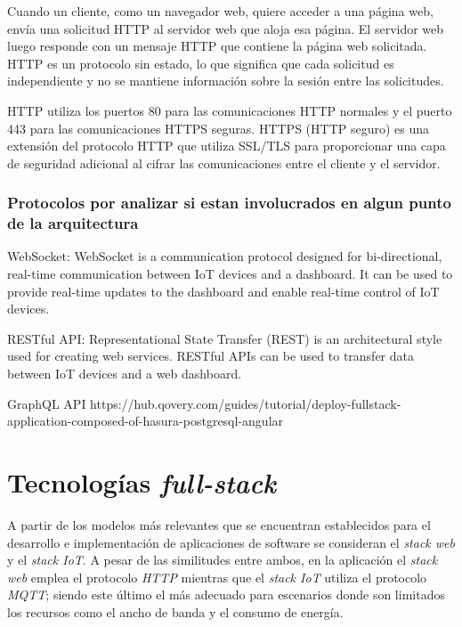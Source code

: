 Cuando un cliente, como un navegador web, quiere acceder a una página web, envía una solicitud HTTP al servidor web que aloja esa página. El servidor web luego responde con un mensaje HTTP que contiene la página web solicitada. HTTP es un protocolo sin estado, lo que significa que cada solicitud es independiente y no se mantiene información sobre la sesión entre las solicitudes.

HTTP utiliza los puertos 80 para las comunicaciones HTTP normales y el puerto 443 para las comunicaciones HTTPS seguras. HTTPS (HTTP seguro) es una extensión del protocolo HTTP que utiliza SSL/TLS para proporcionar una capa de seguridad adicional al cifrar las comunicaciones entre el cliente y el servidor.




\subsubsection{Protocolos por analizar si estan involucrados en algun punto de la arquitectura}


WebSocket: WebSocket is a communication protocol designed for bi-directional, real-time communication between IoT devices and a dashboard. It can be used to provide real-time updates to the dashboard and enable real-time control of IoT devices.

RESTful API: Representational State Transfer (REST) is an architectural style used for creating web services. RESTful APIs can be used to transfer data between IoT devices and a web dashboard.

GraphQL API https://hub.qovery.com/guides/tutorial/deploy-fullstack-application-composed-of-hasura-postgresql-angular



\section{Tecnologías \textit{full-stack}}

A partir de los modelos más relevantes que se encuentran establecidos para el desarrollo e implementación de aplicaciones de software se consideran el \textit{stack web} y el \textit{stack IoT}. A pesar de las similitudes entre ambos, en la aplicación el \textit{stack web} emplea el protocolo \textit{HTTP} mientras que el \textit{stack IoT} utiliza el protocolo \textit{MQTT}; siendo este último el más adecuado para escenarios donde son limitados los recursos como el ancho de banda y el consumo de energía.

